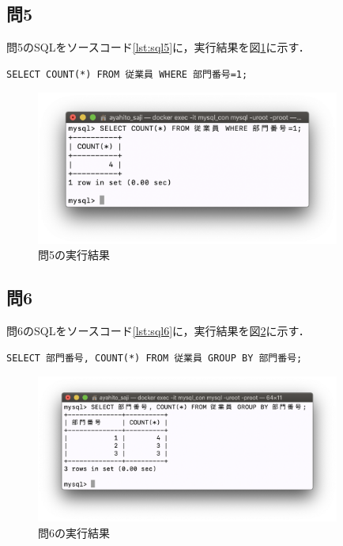 \documentclass[uplatex]{jsarticle}
\begin{document}
\subsection{問5}
問5のSQLをソースコード\ref{lst:sql5}に，実行結果を図\ref{fig:ans5}に示す．
\begin{lstlisting}[caption=問5のSQL,label=lst:sql5]
SELECT COUNT(*) FROM 従業員 WHERE 部門番号=1;
\end{lstlisting}
\begin{figure}[htb]
\begin{center}
\includegraphics[width=100mm]{figures/ans5.png}
\caption{問5の実行結果}
\label{fig:ans5}
\end{center}
\end{figure}

\subsection{問6}
問6のSQLをソースコード\ref{lst:sql6}に，実行結果を図\ref{fig:ans6}に示す．
\begin{lstlisting}[caption=問6のSQL,label=lst:sql6]
SELECT 部門番号, COUNT(*) FROM 従業員 GROUP BY 部門番号;
\end{lstlisting}
\begin{figure}[htb]
\begin{center}
\includegraphics[width=100mm]{figures/ans6.png}
\caption{問6の実行結果}
\label{fig:ans6}
\end{center}
\end{figure}
\end{document}
